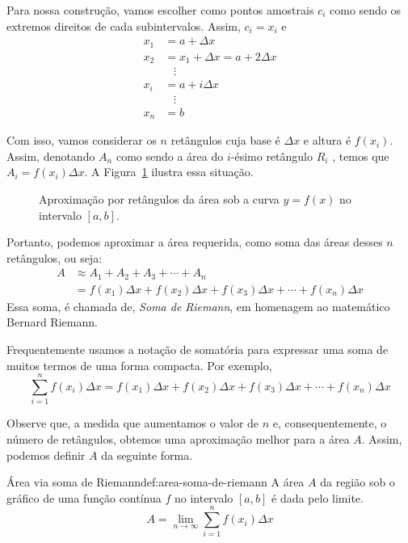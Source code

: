 Para nossa construção, vamos escolher como pontos amostrais $c_i$
como sendo os extremos direitos de cada subintervalos. Assim, $c_i=x_i$ e
\begin{align*}
  x_1 & =a+\Delta x                \\
  x_2 & =x_1+\Delta x= a+2\Delta x \\
      & \;\;\;\vdots               \\
  x_i & =a+i\Delta x               \\
      & \;\;\;\vdots               \\
  x_n & =b
\end{align*}

Com isso, vamos considerar os $n$ retângulos cuja base é $\Delta x$ e
altura é $f(x_i)$. Assim, denotando $A_n$ como sendo a área do $i$-ésimo
retângulo $R_i$ , temos que $A_i= f(x_i) \Delta x$.
A Figura~\ref{fig:retangulos-1} ilustra essa situação.

\begin{figure}
   \centering
   
   \caption{Aproximação por retângulos da área sob a curva $y=f(x)$
      no intervalo $[a, b]$.}
   \label{fig:retangulos-1}
\end{figure}

Portanto, podemos aproximar a área requerida, como soma das áreas desses
$n$ retângulos, ou seja:
\begin{align}
A & \approx A_1+A_2+A_3+\cdots+ A_n \nonumber \\
  & = f(x_1)\Delta x+ f(x_2) \Delta x+ f(x_3) \Delta x + \cdots + f(x_n)\Delta x
\end{align}
Essa soma, é chamada de, \textit{Soma de Riemann}, em homenagem ao
matemático Bernard Riemann.

Frequentemente usamos a notação de somatória para expressar uma soma de
muitos termos de uma forma compacta. Por exemplo,
\[
  \sum_{i=1}^n f(x_i) \Delta x
  = f(x_1) \Delta x
  + f(x_2) \Delta x
  + f(x_3) \Delta x
  + \cdots
  + f(x_n) \Delta x
\]

Observe que, a medida que aumentamos o valor de $n$ e, consequentemente,
o número de retângulos, obtemos uma aproximação melhor para a área $A$.
Assim, podemos definir $A$ da seguinte forma.

\begin{definicao}{Área via soma de Riemann}{def:area-soma-de-riemann}
  A área $A$ da região sob o gráfico de uma função contínua $f$
  no intervalo $[a, b]$ é dada pelo limite.
  \[
    A = \lim_{n \to \infty} \sum_{i=1}^n f(x_i) \Delta x
  \]
\end{definicao}

